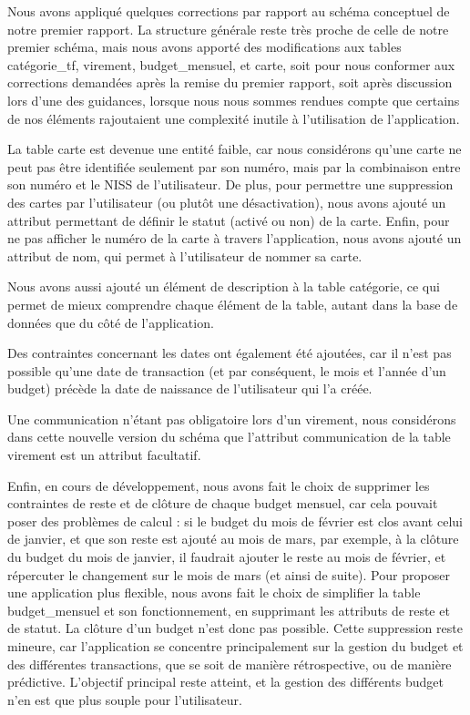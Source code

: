 \documentclass[a4paper,12pt]{article}
\begin{document}
Nous avons appliqué quelques corrections par rapport au schéma conceptuel de notre premier rapport. La structure générale reste très proche de celle de notre premier schéma, mais nous avons apporté des modifications aux tables catégorie\_tf, virement, budget\_mensuel, et carte, soit pour nous conformer aux corrections demandées après la remise du premier rapport, soit après discussion lors d'une des guidances, lorsque nous nous sommes rendues compte que certains de nos éléments rajoutaient une complexité inutile à l'utilisation de l'application.

La table carte est devenue une entité faible, car nous considérons qu'une carte ne peut pas être identifiée seulement par son numéro, mais par la combinaison entre son numéro et le NISS de l'utilisateur. De plus, pour permettre une \og suppression \fg des cartes par l'utilisateur (ou plutôt une désactivation), nous avons ajouté un attribut permettant de définir le statut (activé ou non) de la carte. Enfin, pour ne pas afficher le numéro de la carte à travers l'application, nous avons ajouté un attribut de nom, qui permet à l'utilisateur de nommer sa carte. 

Nous avons aussi ajouté un élément de description à la table catégorie, ce qui permet de mieux comprendre chaque élément de la table, autant dans la base de données que du côté de l'application.

Des contraintes concernant les dates ont également été ajoutées, car il n'est pas possible qu'une date de transaction (et par conséquent, le mois et l'année d'un budget) précède la date de naissance de l'utilisateur qui l'a créée.

Une communication n'étant pas obligatoire lors d'un virement, nous considérons dans cette nouvelle version du schéma que l'attribut communication de la table virement est un attribut facultatif.

Enfin, en cours de développement, nous avons fait le choix de supprimer les contraintes de reste et de clôture de chaque budget mensuel, car cela pouvait poser des problèmes de calcul : si le budget du mois de février est clos avant celui de janvier, et que son reste est ajouté au mois de mars, par exemple, à la clôture du budget du mois de janvier, il faudrait ajouter le reste au mois de février, et répercuter le changement sur le mois de mars (et ainsi de suite).
Pour proposer une application plus flexible, nous avons fait le choix de simplifier la table budget\_mensuel et son fonctionnement, en supprimant les attributs de reste et de statut.
La clôture d'un budget n'est donc pas possible.
Cette suppression reste mineure, car l'application se concentre principalement sur la gestion du budget et des différentes transactions, que se soit de manière rétrospective, ou de manière prédictive. L'objectif principal reste atteint, et la gestion des différents budget n'en est que plus souple pour l'utilisateur.\\
\end{document}
